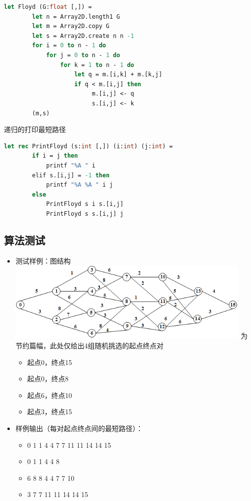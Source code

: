 \documentclass[a4paper]{article}
\begin{document}
\begin{lstlisting}[language=ML]
    let Floyd (G:float [,]) = 
        let n = Array2D.length1 G
        let m = Array2D.copy G
        let s = Array2D.create n n -1
        for i = 0 to n - 1 do
            for j = 0 to n - 1 do
                for k = 1 to n - 1 do
                    let q = m.[i,k] + m.[k,j]
                    if q < m.[i,j] then
                         m.[i,j] <- q
                         s.[i,j] <- k
        (m,s)
\end{lstlisting}

递归的打印最短路径

\begin{lstlisting}[language=ML]
    let rec PrintFloyd (s:int [,]) (i:int) (j:int) = 
        if i = j then
            printf "%A " i
        elif s.[i,j] = -1 then
            printf "%A %A " i j
        else
            PrintFloyd s i s.[i,j]
            PrintFloyd s s.[i,j] j
\end{lstlisting}

\subsection{算法测试}

\begin{itemize}
\item
    测试样例：图结构
    \includegraphics[width=12cm]{4-2.png}
    为节约篇幅，此处仅给出4组随机挑选的起点终点对
    \begin{itemize}
    \item
        起点0，终点15
    \item
        起点0，终点8
    \item
        起点6，终点10
    \item
        起点3，终点15
    \end{itemize}
\item
    样例输出（每对起点终点间的最短路径）：
    \begin{itemize}
    \item
        0 1 1 4 4 7 7 11 11 14 14 15
    \item
        0 1 1 4 4 8
    \item
        6 8 8 4 4 7 7 10
    \item
        3 7 7 11 11 14 14 15
    \end{itemize}
\end{itemize}
\end{document}
